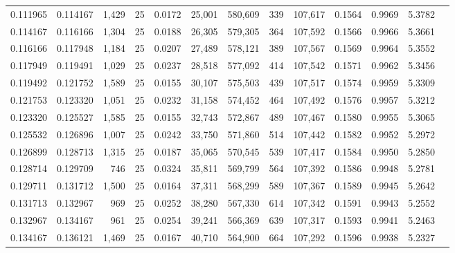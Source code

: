 \begin{tabular}{rrrrrrrrrrrrr}
0.111965 & 0.114167 & 1,429 &  25 &                                     0.0172 &  25,001 & 580,609 &     339 & 107,617 & 0.1564 & 0.9969 & 5.3782 \\
0.114167 & 0.116166 & 1,304 &  25 &                                     0.0188 &  26,305 & 579,305 &     364 & 107,592 & 0.1566 & 0.9966 & 5.3661 \\
0.116166 & 0.117948 & 1,184 &  25 &                                     0.0207 &  27,489 & 578,121 &     389 & 107,567 & 0.1569 & 0.9964 & 5.3552 \\
0.117949 & 0.119491 & 1,029 &  25 &                                     0.0237 &  28,518 & 577,092 &     414 & 107,542 & 0.1571 & 0.9962 & 5.3456 \\
0.119492 & 0.121752 & 1,589 &  25 &                                     0.0155 &  30,107 & 575,503 &     439 & 107,517 & 0.1574 & 0.9959 & 5.3309 \\
0.121753 & 0.123320 & 1,051 &  25 &                                     0.0232 &  31,158 & 574,452 &     464 & 107,492 & 0.1576 & 0.9957 & 5.3212 \\
0.123320 & 0.125527 & 1,585 &  25 &                                     0.0155 &  32,743 & 572,867 &     489 & 107,467 & 0.1580 & 0.9955 & 5.3065 \\
0.125532 & 0.126896 & 1,007 &  25 &                                     0.0242 &  33,750 & 571,860 &     514 & 107,442 & 0.1582 & 0.9952 & 5.2972 \\
0.126899 & 0.128713 & 1,315 &  25 &                                     0.0187 &  35,065 & 570,545 &     539 & 107,417 & 0.1584 & 0.9950 & 5.2850 \\
0.128714 & 0.129709 &   746 &  25 &                                     0.0324 &  35,811 & 569,799 &     564 & 107,392 & 0.1586 & 0.9948 & 5.2781 \\
0.129711 & 0.131712 & 1,500 &  25 &                                     0.0164 &  37,311 & 568,299 &     589 & 107,367 & 0.1589 & 0.9945 & 5.2642 \\
0.131713 & 0.132967 &   969 &  25 &                                     0.0252 &  38,280 & 567,330 &     614 & 107,342 & 0.1591 & 0.9943 & 5.2552 \\
0.132967 & 0.134167 &   961 &  25 &                                     0.0254 &  39,241 & 566,369 &     639 & 107,317 & 0.1593 & 0.9941 & 5.2463 \\
0.134167 & 0.136121 & 1,469 &  25 &                                     0.0167 &  40,710 & 564,900 &     664 & 107,292 & 0.1596 & 0.9938 & 5.2327 \\

\end{tabular}

